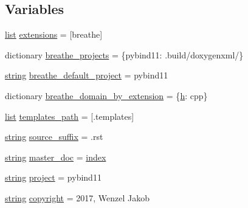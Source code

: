\subsection*{Variables}
\begin{DoxyCompactItemize}
\item 
\mbox{\hyperlink{classlist}{list}} \mbox{\hyperlink{namespaceconf_ae475e080536acb271a0a0efe56c3ba42}{extensions}} = \mbox{[}\textquotesingle{}breathe\textquotesingle{}\mbox{]}
\item 
dictionary \mbox{\hyperlink{namespaceconf_acb47d2c0c2904fa7d36b63142533f383}{breathe\+\_\+projects}} = \{\textquotesingle{}pybind11\textquotesingle{}\+: \textquotesingle{}.build/doxygenxml/\textquotesingle{}\}
\item 
\mbox{\hyperlink{asdl_8h_ae84541b4f3d8e1ea24ec0f466a8c568b}{string}} \mbox{\hyperlink{namespaceconf_a6eba2d2c7ae923054b1c49e686ec89b9}{breathe\+\_\+default\+\_\+project}} = \textquotesingle{}pybind11\textquotesingle{}
\item 
dictionary \mbox{\hyperlink{namespaceconf_a21389186546df811dd31aca1f16f8f5f}{breathe\+\_\+domain\+\_\+by\+\_\+extension}} = \{\textquotesingle{}\mbox{\hyperlink{_s_d_l__opengl__glext_8h_afa0fb1b5e976920c0abeff2dca3ed774}{h}}\textquotesingle{}\+: \textquotesingle{}cpp\textquotesingle{}\}
\item 
\mbox{\hyperlink{classlist}{list}} \mbox{\hyperlink{namespaceconf_ae850ae634911b713e036b43894fdd525}{templates\+\_\+path}} = \mbox{[}\textquotesingle{}.templates\textquotesingle{}\mbox{]}
\item 
\mbox{\hyperlink{asdl_8h_ae84541b4f3d8e1ea24ec0f466a8c568b}{string}} \mbox{\hyperlink{namespaceconf_a10af2a769eb3bd3322e874f677e435b1}{source\+\_\+suffix}} = \textquotesingle{}.rst\textquotesingle{}
\item 
\mbox{\hyperlink{asdl_8h_ae84541b4f3d8e1ea24ec0f466a8c568b}{string}} \mbox{\hyperlink{namespaceconf_a6fcd7e5236f355b1e1a55f9d95988810}{master\+\_\+doc}} = \textquotesingle{}\mbox{\hyperlink{_s_d_l__opengl__glext_8h_a57f14e05b1900f16a2da82ade47d0c6d}{index}}\textquotesingle{}
\item 
\mbox{\hyperlink{asdl_8h_ae84541b4f3d8e1ea24ec0f466a8c568b}{string}} \mbox{\hyperlink{namespaceconf_a45653c983098153b78e33600e39230eb}{project}} = \textquotesingle{}pybind11\textquotesingle{}
\item 
\mbox{\hyperlink{asdl_8h_ae84541b4f3d8e1ea24ec0f466a8c568b}{string}} \mbox{\hyperlink{namespaceconf_a33fa97cf51dcb25970fbf53f10159589}{copyright}} = \textquotesingle{}2017, Wenzel Jakob\textquotesingle{}

\end{DoxyCompactItemize}
